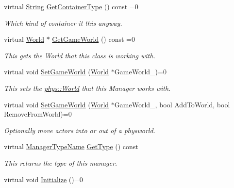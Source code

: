 \begin{DoxyCompactItemize}
virtual \hyperlink{namespacephys_aa03900411993de7fbfec4789bc1d392e}{String} \hyperlink{classphys_1_1ActorContainerBase_a0ed43bc828aaee8ee33152970c3cc16d}{GetContainerType} () const =0
\begin{DoxyCompactList}\small\item\em Which kind of container it this anyway. \item\end{DoxyCompactList}\item 
virtual \hyperlink{classphys_1_1World}{World} $\ast$ \hyperlink{classphys_1_1ActorContainerBase_a479e6c7434f2611b0cfe6ca1fd4ebdd1}{GetGameWorld} () const =0
\begin{DoxyCompactList}\small\item\em This gets the \hyperlink{classphys_1_1World}{World} that this class is working with. \item\end{DoxyCompactList}\item 
virtual void \hyperlink{classphys_1_1ActorContainerBase_ae0cb5c288f17507247dd98d3a2466876}{SetGameWorld} (\hyperlink{classphys_1_1World}{World} $\ast$GameWorld\_\-)=0
\begin{DoxyCompactList}\small\item\em This sets the \hyperlink{classphys_1_1World}{phys::World} that this Manager works with. \item\end{DoxyCompactList}\item 
virtual void \hyperlink{classphys_1_1ActorContainerBase_a366c1797bef08f3a1846bf010e2e2b04}{SetGameWorld} (\hyperlink{classphys_1_1World}{World} $\ast$GameWorld\_\-, bool AddToWorld, bool RemoveFromWorld)=0
\begin{DoxyCompactList}\small\item\em Optionally move actors into or out of a physworld. \item\end{DoxyCompactList}\item 
virtual \hyperlink{classphys_1_1ManagerBase_aaa6ccddf23892eaccb898529414f80a5}{ManagerTypeName} \hyperlink{classphys_1_1ActorContainerBase_aa86380fd1b18d660f68b60f075967cf8}{GetType} () const 
\begin{DoxyCompactList}\small\item\em This returns the type of this manager. \item\end{DoxyCompactList}\item 
virtual void \hyperlink{classphys_1_1ActorContainerBase_af36d5866e0ee9f6f450a4e62642e0928}{Initialize} ()=0

\end{DoxyCompactItemize}
